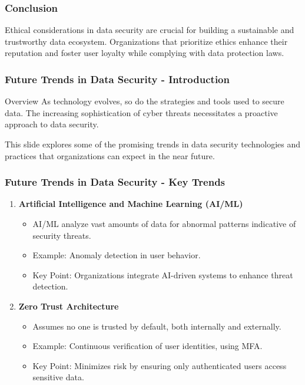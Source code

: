 \documentclass{beamer}
\begin{document}
\begin{frame}[fragile]
    \frametitle{Conclusion}
    Ethical considerations in data security are crucial for building a sustainable and trustworthy data ecosystem. 
    Organizations that prioritize ethics enhance their reputation and foster user loyalty while complying with data protection laws.
\end{frame}

\begin{frame}[fragile]
    \frametitle{Future Trends in Data Security - Introduction}
    \begin{block}{Overview}
        As technology evolves, so do the strategies and tools used to secure data. The increasing sophistication of cyber threats necessitates a proactive approach to data security.
    \end{block}
    This slide explores some of the promising trends in data security technologies and practices that organizations can expect in the near future.
\end{frame}

\begin{frame}[fragile]
    \frametitle{Future Trends in Data Security - Key Trends}
    \begin{enumerate}
        \item \textbf{Artificial Intelligence and Machine Learning (AI/ML)}
            \begin{itemize}
                \item AI/ML analyze vast amounts of data for abnormal patterns indicative of security threats.
                \item Example: Anomaly detection in user behavior.
                \item Key Point: Organizations integrate AI-driven systems to enhance threat detection.
            \end{itemize}
        
        \item \textbf{Zero Trust Architecture}
            \begin{itemize}
                \item Assumes no one is trusted by default, both internally and externally.
                \item Example: Continuous verification of user identities, using MFA.
                \item Key Point: Minimizes risk by ensuring only authenticated users access sensitive data.
            \end{itemize}
    \end{enumerate}
\end{frame}
\end{document}
